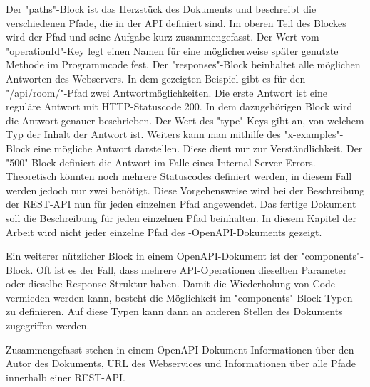 Der "paths"-Block ist das Herzstück des Dokuments und beschreibt die verschiedenen Pfade, die in der API definiert sind. Im oberen Teil des Blockes wird der Pfad und seine Aufgabe kurz zusammengefasst. Der Wert vom "operationId"-Key legt einen Namen für eine möglicherweise später genutzte Methode im Programmcode fest. Der "responses"-Block beinhaltet alle möglichen Antworten des Webservers. In dem gezeigten Beispiel gibt es für den "/api/room/"-Pfad zwei Antwortmöglichkeiten. Die erste Antwort ist eine reguläre Antwort mit HTTP-Statuscode 200. In dem dazugehörigen Block wird die Antwort genauer beschrieben. Der Wert des "type"-Keys gibt an, von welchem Typ der Inhalt der Antwort ist. Weiters kann man mithilfe des "x-examples"-Block eine mögliche Antwort darstellen. Diese dient nur zur Verständlichkeit. Der "500"-Block definiert die Antwort im Falle eines Internal Server Errors. Theoretisch könnten noch mehrere Statuscodes definiert werden, in diesem Fall werden jedoch nur zwei benötigt. Diese Vorgehensweise wird bei der Beschreibung der REST-API nun für jeden einzelnen Pfad angewendet. Das fertige Dokument soll die Beschreibung für jeden einzelnen Pfad beinhalten. In diesem Kapitel der Arbeit wird nicht jeder einzelne Pfad des \ZELIA-OpenAPI-Dokuments gezeigt.

Ein weiterer nützlicher Block in einem OpenAPI-Dokument ist der "components"-Block. Oft ist es der Fall, dass mehrere API-Operationen dieselben Parameter oder dieselbe Response-Struktur haben. Damit die Wiederholung von Code vermieden werden kann, besteht die Möglichkeit im "components"-Block Typen zu definieren. Auf diese Typen kann dann an anderen Stellen des Dokuments zugegriffen werden. 

Zusammengefasst stehen in einem OpenAPI-Dokument Informationen über den Autor des Dokuments, URL des Webservices und Informationen über alle Pfade innerhalb einer REST-API. 

